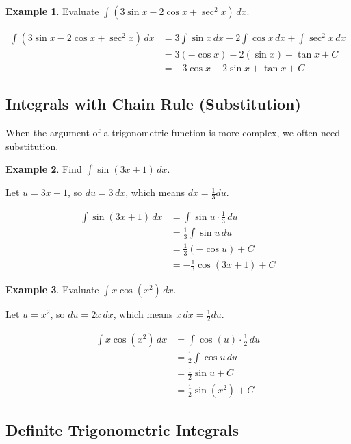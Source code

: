 \documentclass[12pt,a4paper]{book}
\theoremstyle{definition}
\newtheorem{example}{Example}[chapter]
\begin{document}
\begin{example}
Evaluate $\int (3\sin x - 2\cos x + \sec^2 x) \, dx$.

\begin{align}
\int (3\sin x - 2\cos x + \sec^2 x) \, dx &= 3\int \sin x \, dx - 2\int \cos x \, dx + \int \sec^2 x \, dx\\
&= 3(-\cos x) - 2(\sin x) + \tan x + C\\
&= -3\cos x - 2\sin x + \tan x + C
\end{align}
\end{example}

\subsection{Integrals with Chain Rule (Substitution)}

When the argument of a trigonometric function is more complex, we often need substitution.

\begin{example}
Find $\int \sin(3x + 1) \, dx$.

Let $u = 3x + 1$, so $du = 3 \, dx$, which means $dx = \frac{1}{3} du$.

\begin{align}
\int \sin(3x + 1) \, dx &= \int \sin u \cdot \frac{1}{3} \, du\\
&= \frac{1}{3} \int \sin u \, du\\
&= \frac{1}{3}(-\cos u) + C\\
&= -\frac{1}{3}\cos(3x + 1) + C
\end{align}
\end{example}

\begin{example}
Evaluate $\int x \cos(x^2) \, dx$.

Let $u = x^2$, so $du = 2x \, dx$, which means $x \, dx = \frac{1}{2} du$.

\begin{align}
\int x \cos(x^2) \, dx &= \int \cos(u) \cdot \frac{1}{2} \, du\\
&= \frac{1}{2} \int \cos u \, du\\
&= \frac{1}{2} \sin u + C\\
&= \frac{1}{2} \sin(x^2) + C
\end{align}
\end{example}

\subsection{Definite Trigonometric Integrals}
\end{document}
